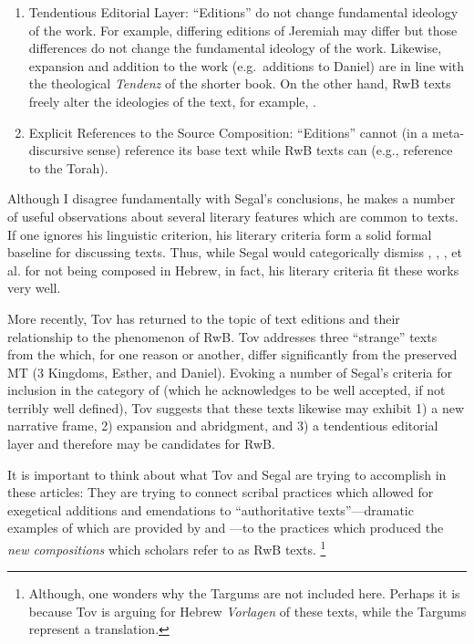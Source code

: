 \begin{enumerate}
    \item Tendentious Editorial Layer: ``Editions'' do not change fundamental ideology of the work. For example, differing editions of Jeremiah may differ but those differences do not change the fundamental ideology of the work. Likewise, expansion and addition to the work (e.g.~additions to Daniel) are in line with the theological \emph{Tendenz} of the shorter book. On the other hand, RwB texts freely alter the ideologies of the text, for example, \jub.\autocite[25]{segal_henze2005}

    \item Explicit References to the Source Composition: ``Editions'' cannot (in a meta-discursive sense) reference its base text while RwB texts can (e.g., \jub reference to the Torah).
\end{enumerate} 

Although I disagree fundamentally with Segal's conclusions, he makes a number of useful observations about several literary features which are common to \rwb texts. If one ignores his linguistic criterion, his literary criteria form a solid formal baseline for discussing \rwb texts. Thus, while Segal would categorically dismiss \ga, \ant, \lab, et al. for not being composed in Hebrew, in fact, his literary criteria fit these works very well.

More recently, Tov has returned to the topic of text editions and their relationship to the phenomenon of RwB.\autocite{tov_krarrer-kraus2008} Tov addresses three ``strange'' texts from the \lxx which, for one reason or another, differ significantly from the preserved MT (3 Kingdoms, Esther, and Daniel). Evoking a number of Segal's criteria\autocite{segal_henze2005} for inclusion in the category of \rwb (which he acknowledges to be well accepted, if not terribly well defined), Tov suggests that these \lxx texts likewise may exhibit 1) a new narrative frame, 2) expansion and abridgment, and 3) a tendentious editorial layer and therefore may be candidates for RwB. 

It is important to think about what Tov and Segal are trying to accomplish in these articles: They are trying to connect scribal practices which allowed for exegetical additions and emendations to ``authoritative texts''---dramatic examples of which are provided by \sampent and \lxx---to the practices which produced the \emph{new compositions} which scholars refer to as RwB texts.%
%
\footnote{Although, one wonders why the Targums are not included here. Perhaps it is because Tov is arguing for Hebrew \emph{Vorlagen} of these texts, while the Targums represent a translation.}

